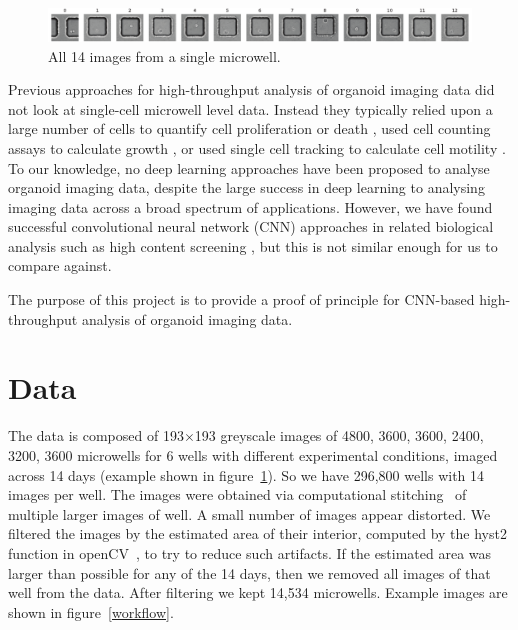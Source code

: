 \documentclass[10pt,twocolumn,letterpaper]{article}
\begin{document}
 \begin{figure}[t!]
\begin{center}
\includegraphics[width=0.9\linewidth]{figures/classification/well_4166_condition_A1_all_days_images_small.pdf}
\end{center}
   \caption{All 14 images from a single microwell.}
\label{well_4166_condition_A1_all_days_images_small}
\end{figure}

Previous approaches for high-throughput analysis of organoid imaging data did not look at single-cell microwell level data.  Instead they typically relied upon a large number of cells to quantify cell proliferation or death \cite{jabs2017screening},  used cell counting assays to calculate growth \cite{sebrell2018live}, or used single cell tracking to calculate cell motility \cite{geum2016epidermal}.  To our knowledge, no deep learning approaches have been proposed to analyse organoid imaging data, despite the large success in deep learning to analysing imaging data across a broad spectrum of applications.  However, we have found successful convolutional neural network (CNN) approaches in related biological analysis such as high content screening \cite{simm2018repurposing}, but this is not similar enough for us to compare against.



The purpose of this project is to provide a proof of principle for CNN-based high-throughput analysis of organoid imaging data.  



\section{Data}








The data is composed of 193$\times$193 greyscale images of 4800, 3600, 3600, 2400, 3200, 3600 microwells for 6 wells with different experimental conditions, imaged across 14 days (example shown in figure~\ref{well_4166_condition_A1_all_days_images_small}).  So we have 296,800 wells with 14 images per well.  The images were obtained via computational stitching~\cite{preibisch2009globally} of multiple larger images of well.  A small number of images appear distorted.  We filtered the images by the estimated area of their interior, computed by the hyst2 function in openCV~\cite{opencv_library}, to try to reduce such artifacts.  If the estimated area was larger than possible for any of the 14 days, then we removed all images of that well from the data.  After filtering we kept 14,534 microwells.  Example images are shown in figure~\ref{workflow}.
\end{document}
